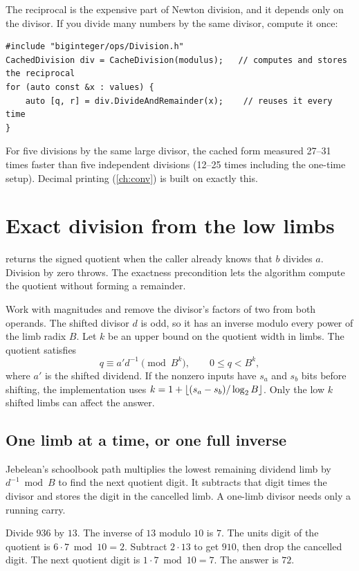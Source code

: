 The reciprocal is the expensive part of Newton division, and it depends only on the divisor.
If you divide many numbers by the same divisor, compute it once:

\begin{lstlisting}
#include "biginteger/ops/Division.h"
CachedDivision div = CacheDivision(modulus);   // computes and stores the reciprocal
for (auto const &x : values) {
    auto [q, r] = div.DivideAndRemainder(x);    // reuses it every time
}
\end{lstlisting}

For five divisions by the same large divisor, the cached form measured 27--31 times faster
than five independent divisions (12--25 times including the one-time setup). Decimal printing
(\cref{ch:conv}) is built on exactly this.

\clearpage
\section{Exact division from the low limbs}
\label{sec:exactdivision}

 returns the signed quotient when the caller
already knows that $b$ divides $a$. Division by zero throws. The exactness
precondition lets the algorithm compute the quotient without forming a
remainder.

Work with magnitudes and remove the divisor's factors of two from both
operands. The shifted divisor $d$ is odd, so it has an inverse modulo
every power of the limb radix $B$. Let $k$ be an upper bound on the
quotient width in limbs. The quotient satisfies
\[
  q \equiv a' d^{-1} \pmod{B^k}, \qquad 0 \le q < B^k ,
\]
where $a'$ is the shifted dividend. If the nonzero inputs have $s_a$
and $s_b$ bits before shifting, the implementation uses
$k=1+\left\lfloor (s_a-s_b)/\log_2 B \right\rfloor$. Only the low $k$ shifted limbs
can affect the answer.

\subsection{One limb at a time, or one full inverse}

Jebelean's schoolbook path multiplies the lowest remaining dividend
limb by $d^{-1}\bmod B$ to find the next quotient digit. It subtracts
that digit times the divisor and stores the digit in the cancelled
limb. A one-limb divisor needs only a running carry.

\begin{example}
Divide $936$ by $13$. The inverse of $13$ modulo $10$ is $7$.
The units digit of the quotient is $6\cdot7\bmod10=2$.
Subtract $2\cdot13$ to get $910$, then drop the cancelled digit.
The next quotient digit is $1\cdot7\bmod10=7$. The answer is $72$.
\end{example}

